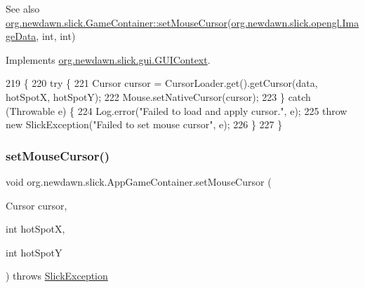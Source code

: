 \begin{DoxySeeAlso}{See also}
\mbox{\hyperlink{classorg_1_1newdawn_1_1slick_1_1_game_container_a13e789e67755f14bad1caf70e3bd6d4e}{org.\+newdawn.\+slick.\+Game\+Container\+::set\+Mouse\+Cursor}}(\mbox{\hyperlink{interfaceorg_1_1newdawn_1_1slick_1_1opengl_1_1_image_data}{org.\+newdawn.\+slick.\+opengl.\+Image\+Data}}, int, int) 
\end{DoxySeeAlso}


Implements \mbox{\hyperlink{interfaceorg_1_1newdawn_1_1slick_1_1gui_1_1_g_u_i_context_a06020a7f3e4688fa7aa76f9c07b3958a}{org.\+newdawn.\+slick.\+gui.\+G\+U\+I\+Context}}.


\begin{DoxyCode}
219                                                                                                  \{
220         \textcolor{keywordflow}{try} \{
221             Cursor cursor = CursorLoader.get().getCursor(data, hotSpotX, hotSpotY);
222             Mouse.setNativeCursor(cursor);
223         \} \textcolor{keywordflow}{catch} (Throwable e) \{
224             Log.error(\textcolor{stringliteral}{"Failed to load and apply cursor."}, e);
225             \textcolor{keywordflow}{throw} \textcolor{keyword}{new} SlickException(\textcolor{stringliteral}{"Failed to set mouse cursor"}, e);
226         \}
227     \}
\end{DoxyCode}
\mbox{\label{classorg_1_1newdawn_1_1slick_1_1_app_game_container_a70afe6f383739a5607c145a9fd193c26}} 
\subsubsection{\texorpdfstring{set\+Mouse\+Cursor()}{setMouseCursor()}\hspace{0.1cm}{\footnotesize\ttfamily [3/4]}}
{\footnotesize\ttfamily void org.\+newdawn.\+slick.\+App\+Game\+Container.\+set\+Mouse\+Cursor (\begin{DoxyParamCaption}\item[{Cursor}]{cursor,  }\item[{int}]{hot\+SpotX,  }\item[{int}]{hot\+SpotY }\end{DoxyParamCaption}) throws \mbox{\hyperlink{classorg_1_1newdawn_1_1slick_1_1_slick_exception}{Slick\+Exception}}\hspace{0.3cm}{\ttfamily [inline]}}

